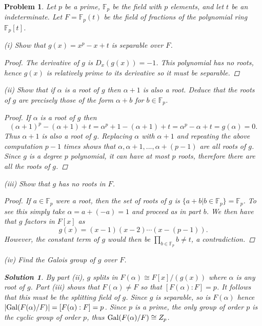 \documentclass[11pt]{article}
\newcommand{\F}{\mathbb{F}}
\newcommand{\1}{\textbf{1}}
\newtheorem{prob}{Problem}
\newtheorem*{sol*}{\textit{Solution}}
\begin{document}
\begin{prob}
Let $p$ be a prime, $\F_p$ be the field with $p$ elements, and let $t$ be an indeterminate. Let $F = \F_p(t)$ be the field of fractions of the polynomial ring $\F_p[t]$. 

\noindent (i) Show that $g(x) = x^p - x + t$ is separable over $F$. 

\begin{proof}
The derivative of $g$ is $D_x(g(x)) = -1$. This polynomial has no roots, hence $g(x)$ is relatively prime to its derivative so it must be separable.
\end{proof}

\noindent (ii) Show that if $\alpha$ is a root of $g$ then $\alpha + 1$ is also a root. Deduce that the roots of $g$ are precisely those of the form $\alpha + b$ for $b\in\F_p$. 

\begin{proof}
If $\alpha$ is a root of $g$ then \[(\alpha + 1)^p - (\alpha + 1) + t = \alpha^p + 1 - (\alpha + 1) + t = \alpha^p - \alpha + t = g(\alpha) = 0.\] Thus $\alpha + 1$ is also a root of $g$. Replacing $\alpha$ with $\alpha + 1$ and repeating the above computation $p-1$ times shows that $\alpha, \alpha + 1,...,\alpha + (p-1)$ are all roots of $g$. Since $g$ is a degree $p$ polynomial, it can have at most $p$ roots, therefore there are all the roots of $g$. 

\end{proof}

\noindent (iii) Show that $g$ has no roots in $F$.  

\begin{proof}
If $a\in \F_p$ were a root, then the set of roots of $g$ is $\{a + b| b\in\F_p\} = \F_p$. To see this simply take $\alpha = a + (-a) = 1$ and proceed as in part $b$. We then have that $g$ factors in $F[x]$ as \[g(x) = (x - 1)(x - 2)\cdots (x-(p-1)).\] However, the constant term of $g$ would then be $\prod_{b\in\F_p}b \neq t$, a contradiction. 
\end{proof}


\noindent (iv) Find the Galois group of $g$ over $F$. 

\begin{sol*}
\textnormal{By part (ii), $g$ splits in $F(\alpha)\cong F[x]/(g(x))$ where $\alpha$ is any root of $g$. Part (iii) shows that $F(\alpha)\neq F$ so that $[F(\alpha): F] = p$. It follows that this must be the splitting field of $g$. Since $g$ is separable, so is $F(\alpha)$ hence $|\textnormal{Gal}(F(\alpha)/F)| = [F(\alpha):F] = p$. Since $p$ is a prime, the only group of order $p$ is the cyclic group of order $p$, thus $\textnormal{Gal}(F(\alpha)/F)\cong Z_p$. 
}
\end{sol*}
\end{prob}
\end{document}
